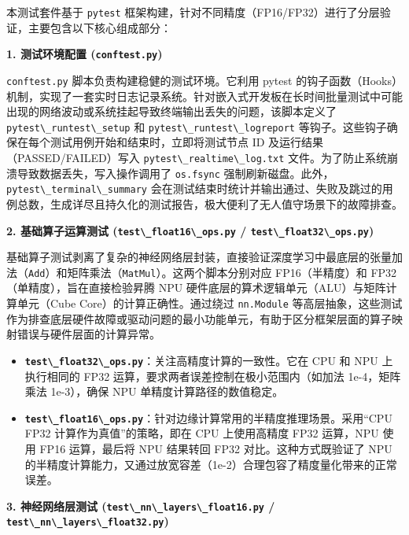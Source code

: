 本测试套件基于 \passthrough{\lstinline!pytest!}
框架构建，针对不同精度（FP16/FP32）进行了分层验证，主要包含以下核心组成部分：

\textbf{1. 测试环境配置 (\passthrough{\lstinline!conftest.py!})}

\passthrough{\lstinline!conftest.py!} 脚本负责构建稳健的测试环境。它利用
pytest
的钩子函数（Hooks）机制，实现了一套实时日志记录系统。针对嵌入式开发板在长时间批量测试中可能出现的网络波动或系统挂起导致终端输出丢失的问题，该脚本定义了
\passthrough{\lstinline!pytest\_runtest\_setup!} 和
\passthrough{\lstinline!pytest\_runtest\_logreport!}
等钩子。这些钩子确保在每个测试用例开始和结束时，立即将测试节点 ID
及运行结果（PASSED/FAILED）写入
\passthrough{\lstinline!pytest\_realtime\_log.txt!}
文件。为了防止系统崩溃导致数据丢失，写入操作调用了
\passthrough{\lstinline!os.fsync!}
强制刷新磁盘。此外，\passthrough{\lstinline!pytest\_terminal\_summary!}
会在测试结束时统计并输出通过、失败及跳过的用例总数，生成详尽且持久化的测试报告，极大便利了无人值守场景下的故障排查。

\textbf{2. 基础算子运算测试
(\passthrough{\lstinline!test\_float16\_ops.py!} /
\passthrough{\lstinline!test\_float32\_ops.py!})}

基础算子测试剥离了复杂的神经网络层封装，直接验证深度学习中最底层的张量加法（\passthrough{\lstinline!Add!}）和矩阵乘法（\passthrough{\lstinline!MatMul!}）。这两个脚本分别对应
FP16（半精度）和 FP32（单精度），旨在直接检验昇腾 NPU
硬件底层的算术逻辑单元（ALU）与矩阵计算单元（Cube
Core）的计算正确性。通过绕过 \passthrough{\lstinline!nn.Module!}
等高层抽象，这些测试作为排查底层硬件故障或驱动问题的最小功能单元，有助于区分框架层面的算子映射错误与硬件层面的计算异常。

\begin{itemize}
\tightlist
\item
  \textbf{\passthrough{\lstinline!test\_float32\_ops.py!}}：关注高精度计算的一致性。它在
  CPU 和 NPU 上执行相同的 FP32
  运算，要求两者误差控制在极小范围内（如加法 1e-4，矩阵乘法 1e-3），确保
  NPU 单精度计算路径的数值稳定。
\item
  \textbf{\passthrough{\lstinline!test\_float16\_ops.py!}}：针对边缘计算常用的半精度推理场景。采用``CPU
  FP32 计算作为真值''的策略，即在 CPU 上使用高精度 FP32 运算，NPU 使用
  FP16 运算，最后将 NPU 结果转回 FP32 对比。这种方式既验证了 NPU
  的半精度计算能力，又通过放宽容差（1e-2）合理包容了精度量化带来的正常误差。
\end{itemize}

\textbf{3. 神经网络层测试
(\passthrough{\lstinline!test\_nn\_layers\_float16.py!} /
\passthrough{\lstinline!test\_nn\_layers\_float32.py!})}

